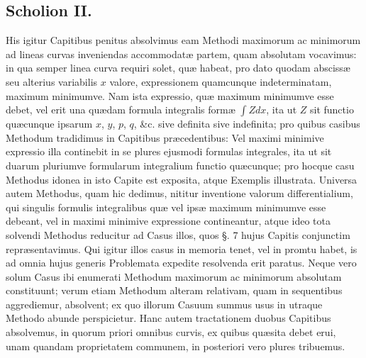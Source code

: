 \subsection*{Scholion II.}
His igitur Capitibus penitus absolvimus eam Methodi maximorum ac minimorum ad lineas curvas inveniendas accommodatæ partem, quam absolutam vocavimus: in qua semper linea curva requiri solet, quæ habeat, pro dato quodam abscissæ seu alterius variabilis $x$ valore, expressionem quamcunque indeterminatam, maximum minimumve. Nam ista expressio, quæ maximum minimumve esse debet, vel erit una quædam formula integralis formæ $\int Zdx$, ita ut $Z$ sit functio quæcunque ipsarum $x$, $y$, $p$, $q$, \&c. sive definita sive indefinita; pro quibus casibus Methodum tradidimus in Capitibus præcedentibus: Vel maximi minimive expressio illa continebit in se plures ejusmodi formulas integrales, ita ut sit duarum pluriumve formularum integralium functio quæcunque; pro hocque casu Methodus idonea in isto Capite est exposita, atque Exemplis illustrata. Universa autem Methodus, quam hic dedimus, nititur inventione valorum differentialium, qui singulis formulis integralibus quæ vel ipsæ maximum minimumve esse debeant, vel in maximi minimive expressione contineantur, atque ideo tota solvendi Methodus reducitur ad Casus illos, quos §. 7 hujus Capitis conjunctim repræsentavimus. Qui igitur illos casus in memoria tenet, vel in promtu habet, is ad omnia hujus generis Problemata expedite resolvenda erit paratus. Neque vero solum Casus ibi enumerati Methodum maximorum ac minimorum absolutam constituunt; verum etiam Methodum alteram relativam, quam in sequentibus aggrediemur, absolvent; ex quo illorum Casuum summus usus in utraque Methodo abunde perspicietur. Hanc autem tractationem duobus Capitibus absolvemus, in quorum priori omnibus curvis, ex quibus quæsita debet erui, unam quandam proprietatem communem, in posteriori vero plures tribuemus.
